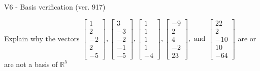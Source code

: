 \begin{exercise}
  \begin{exerciseTitle}V6 - Basis verification (ver. 917)\end{exerciseTitle}
  \begin{exerciseStatement}
    Explain why the vectors \(\left[\begin{array}{r}
1 \\
2 \\
-2 \\
2 \\
-5
\end{array}\right] , \left[\begin{array}{r}
3 \\
-3 \\
-2 \\
-1 \\
-5
\end{array}\right] , \left[\begin{array}{r}
1 \\
1 \\
1 \\
1 \\
-4
\end{array}\right] , \left[\begin{array}{r}
-9 \\
2 \\
4 \\
-2 \\
23
\end{array}\right] , \text{ and } \left[\begin{array}{r}
22 \\
2 \\
-10 \\
10 \\
-64
\end{array}\right]\) are or are not a basis of \(\mathbb{R}^5\)	



\end{exerciseStatement}
\end{exercise}
